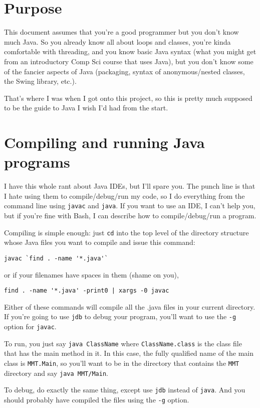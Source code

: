 \documentclass{article}
\begin{document}
\section{Purpose}
This document assumes that you're a good programmer but you don't know much Java. So you already know all about loops and classes, you're kinda comfortable with threading, and you know basic Java syntax (what you might get from an introductory Comp Sci course that uses Java), but you don't know some of the fancier aspects of Java (packaging, syntax of anonymous/nested classes, the Swing library, etc.).

That's where I was when I got onto this project, so this is pretty much supposed to be the guide to Java I wish I'd had from the start.

\section{Compiling and running Java programs}
I have this whole rant about Java IDEs, but I'll spare you. The punch line is that I hate using them to compile/debug/run my code, so I do everything from the command line using \verb!javac! and \verb!java!. If you want to use an IDE, I can't help you, but if you're fine with Bash, I can describe how to compile/debug/run a program.

Compiling is simple enough: just \verb!cd! into the top level of the directory structure whose Java files you want to compile and issue this command:
\begin{verbatim}
javac `find . -name '*.java'`
\end{verbatim}
or if your filenames have spaces in them (shame on you),
\begin{verbatim}
find . -name '*.java' -print0 | xargs -0 javac
\end{verbatim}
Either of these commands will compile all the .java files in your current directory. If you're going to use \verb!jdb! to debug your program, you'll want to use the \verb!-g! option for \verb!javac!.

To run, you just say \verb!java ClassName! where \verb!ClassName.class! is the class file that has the main method in it. In this case, the fully qualified name of the main class is \verb!MMT.Main!, so you'll want to be in the directory that contains the \verb!MMT! directory and say \verb!java MMT/Main!.

To debug, do exactly the same thing, except use \verb!jdb! instead of \verb!java!. And you should probably have compiled the files using the \verb!-g! option.
\end{document}

